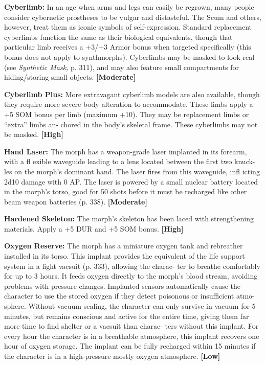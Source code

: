 \textbf{Cyberlimb:} In an age when arms and legs can 
easily be regrown, many people consider cybernetic 
prostheses to be vulgar and distasteful. The Scum 
and others, however, treat them as iconic symbols 
of self-expression. Standard replacement cyberlimbs 
function the same as their biological equivalents, 
though that particular limb receives a +3/+3 Armor 
bonus when targeted specifically (this bonus does not 
apply to synthmorphs). Cyberlimbs may be masked 
to look real (see \textit{Synthetic Mask,} p. 311), and may 
also feature small compartments for hiding/storing 
small objects. \textbf{[Moderate]}

\textbf{Cyberlimb Plus:} More extravagant cyberlimb 
models are also available, though they require more 
severe body alteration to accommodate. These limbs 
apply a +5 SOM bonus per limb (maximum +10). 
They may be replacement limbs or ``extra'' limbs an-
chored in the body's skeletal frame. These cyberlimbs 
may not be masked. \textbf{[High]}

\textbf{Hand Laser: }The morph has a weapon-grade laser 
implanted in its forearm, with a fl exible waveguide 
leading to a lens located between the first two knuck-
les on the morph's dominant hand. The laser fires 
from this waveguide, infl icting 2d10 damage with 0 
AP. The laser is powered by a small nuclear battery 
located in the morph's torso, good for 50 shots before 
it must be recharged like other beam weapon batteries 
(p. 338). \textbf{[Moderate]}

\textbf{Hardened Skeleton: }The morph's skeleton has been 
laced with strengthening materials. Apply a +5 DUR 
and +5 SOM bonus. \textbf{[High]}

\textbf{Oxygen Reserve: }The morph has a miniature 
oxygen tank and rebreather installed in its torso. This 
implant provides the equivalent of the life support 
system in a light vacsuit (p. 333), allowing the charac-
ter to breathe comfortably for up to 3 hours. It feeds 
oxygen directly to the morph's blood stream, avoiding 
problems with pressure changes. Implanted sensors 
automatically cause the character to use the stored 
oxygen if they detect poisonous or insufficient atmo-
sphere. Without vacuum sealing, the character can 
only survive in vacuum for 5 minutes, but remains 
conscious and active for the entire time, giving them 
far more time to find shelter or a vacsuit than charac-
ters without this implant. For every hour the character 
is in a breathable atmosphere, this implant recovers 
one hour of oxygen storage. The implant can be fully 
recharged within 15 minutes if the character is in a 
high-pressure mostly oxygen atmosphere. \textbf{[Low]}

